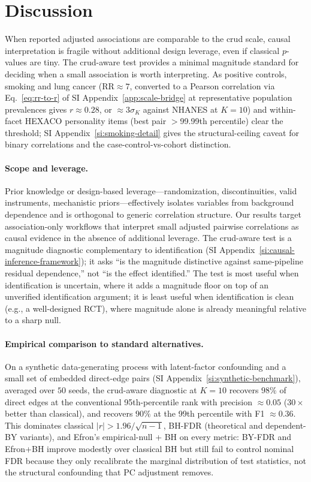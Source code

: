 \section{Discussion}

When reported adjusted associations are comparable to the crud scale, causal interpretation is fragile without additional design leverage, even if classical $p$-values are tiny. The crud-aware test provides a minimal magnitude standard for deciding when a small association is worth interpreting. As positive controls, smoking and lung cancer (RR$\approx 7$, converted to a Pearson correlation via Eq.~\eqref{eq:rr-to-r} of SI Appendix~\ref{app:scale-bridge} at representative population prevalences gives $r\approx 0.28$, or $\approx 3\sigma_K$ against NHANES at $K=10$) and within-facet HEXACO personality items (best pair $>$99.99th percentile) clear the threshold; SI Appendix~\ref{si:smoking-detail} gives the structural-ceiling caveat for binary correlations and the case-control-vs-cohort distinction.

\paragraph{Scope and leverage.} Prior knowledge or design-based leverage---randomization, discontinuities, valid instruments, mechanistic priors---effectively isolates variables from background dependence and is orthogonal to generic correlation structure. Our results target association-only workflows that interpret small adjusted pairwise correlations as causal evidence in the absence of additional leverage. The crud-aware test is a magnitude diagnostic complementary to identification (SI Appendix~\ref{si:causal-inference-framework}); it asks ``is the magnitude distinctive against same-pipeline residual dependence,'' not ``is the effect identified.'' The test is most useful when identification is uncertain, where it adds a magnitude floor on top of an unverified identification argument; it is least useful when identification is clean (e.g., a well-designed RCT), where magnitude alone is already meaningful relative to a sharp null.

\paragraph{Empirical comparison to standard alternatives.} On a synthetic data-generating process with latent-factor confounding and a small set of embedded direct-edge pairs (SI Appendix~\ref{si:synthetic-benchmark}), averaged over $50$ seeds, the crud-aware diagnostic at $K=10$ recovers $98\%$ of direct edges at the conventional 95th-percentile rank with precision $\approx 0.05$ ($30\times$ better than classical), and recovers $90\%$ at the 99th percentile with F1 $\approx 0.36$. This dominates classical $|r|>1.96/\sqrt{n-1}$, BH-FDR (theoretical and dependent-BY variants), and Efron's empirical-null + BH \citep{efron2004} on every metric: BY-FDR and Efron+BH improve modestly over classical BH but still fail to control nominal FDR because they only recalibrate the marginal distribution of test statistics, not the structural confounding that PC adjustment removes.

